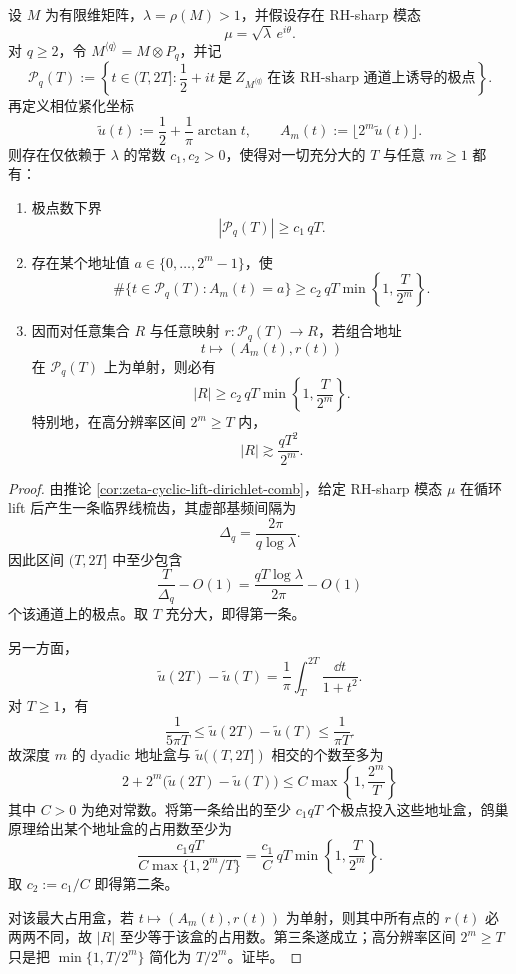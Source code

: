 \begin{theorem}\label{thm:conclusion-rhsharp-q-amplified-address-barrier}
设 \(M\) 为有限维矩阵，\(\lambda=\rho(M)>1\)，并假设存在 RH-sharp 模态
\[
\mu=\sqrt{\lambda}\,e^{i\theta}.
\]
对 \(q\ge 2\)，令 \(M^{\langle q\rangle}=M\otimes P_q\)，并记
\[
\mathcal P_q(T)
:=
\left\{
t\in(T,2T]:
\frac12+it\ \text{是}\ Z_{M^{\langle q\rangle}}\ \text{在该 RH-sharp 通道上诱导的极点}
\right\}.
\]
再定义相位紧化坐标
\[
\widetilde u(t):=\frac12+\frac{1}{\pi}\arctan t,
\qquad
A_m(t):=\lfloor 2^m\widetilde u(t)\rfloor.
\]
则存在仅依赖于 \(\lambda\) 的常数 \(c_1,c_2>0\)，使得对一切充分大的 \(T\) 与任意 \(m\ge 1\) 都有：
\begin{enumerate}
  \item 极点数下界
  \[
  |\mathcal P_q(T)|\ge c_1\,qT.
  \]
  \item 存在某个地址值 \(a\in\{0,\dots,2^m-1\}\)，使
  \[
  \#\{t\in\mathcal P_q(T):A_m(t)=a\}
  \ge
  c_2\,qT\min\!\left\{1,\frac{T}{2^m}\right\}.
  \]
  \item 因而对任意集合 \(R\) 与任意映射 \(r:\mathcal P_q(T)\to R\)，若组合地址
  \[
  t\longmapsto (A_m(t),r(t))
  \]
  在 \(\mathcal P_q(T)\) 上为单射，则必有
  \[
  |R|
  \ge
  c_2\,qT\min\!\left\{1,\frac{T}{2^m}\right\}.
  \]
  特别地，在高分辨率区间 \(2^m\ge T\) 内，
  \[
  |R|\gtrsim \frac{qT^2}{2^m}.
  \]
\end{enumerate}
\end{theorem}
\begin{proof}
由推论 \ref{cor:zeta-cyclic-lift-dirichlet-comb}，给定 RH-sharp 模态 \(\mu\) 在循环 lift 后产生一条临界线梳齿，其虚部基频间隔为
\[
\Delta_q=\frac{2\pi}{q\log\lambda}.
\]
因此区间 \((T,2T]\) 中至少包含
\[
\frac{T}{\Delta_q}-O(1)
=
\frac{qT\log\lambda}{2\pi}-O(1)
\]
个该通道上的极点。取 \(T\) 充分大，即得第一条。

另一方面，
\[
\widetilde u(2T)-\widetilde u(T)
=
\frac{1}{\pi}\int_T^{2T}\frac{\dd t}{1+t^2}.
\]
对 \(T\ge 1\)，有
\[
\frac{1}{5\pi T}
\le
\widetilde u(2T)-\widetilde u(T)
\le
\frac{1}{\pi T}.
\]
故深度 \(m\) 的 dyadic 地址盒与 \(\widetilde u((T,2T])\) 相交的个数至多为
\[
2+2^m\bigl(\widetilde u(2T)-\widetilde u(T)\bigr)
\le
C\max\!\left\{1,\frac{2^m}{T}\right\}
\]
其中 \(C>0\) 为绝对常数。将第一条给出的至少 \(c_1qT\) 个极点投入这些地址盒，鸽巢原理给出某个地址盒的占用数至少为
\[
\frac{c_1qT}{C\max\{1,2^m/T\}}
=
\frac{c_1}{C}\,qT\min\!\left\{1,\frac{T}{2^m}\right\}.
\]
取 \(c_2:=c_1/C\) 即得第二条。

对该最大占用盒，若 \(t\mapsto(A_m(t),r(t))\) 为单射，则其中所有点的 \(r(t)\) 必两两不同，故 \(|R|\) 至少等于该盒的占用数。第三条遂成立；高分辨率区间 \(2^m\ge T\) 只是把 \(\min\{1,T/2^m\}\) 简化为 \(T/2^m\)。证毕。
\end{proof}

